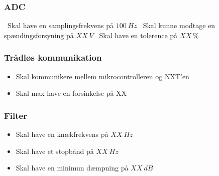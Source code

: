 \subsubsection{ADC}
\begin{itemize}
\ Skal have en samplingsfrekvens på $100~Hz$
\ Skal kunne modtage en spændingsforsyning på  $XX~V$
\ Skal have en tolerence på $XX~\%$
\end{itemize}

\subsubsection{Trådløs kommunikation}
\begin{itemize}
\item Skal kommunikere mellem mikrocontrolleren og NXT'en 
\item Skal max have en forsinkelse på XX
\end{itemize}

\subsubsection{Filter}
\begin{itemize}
\item Skal have en knækfrekvens på $XX~Hz$
\item Skal have et stopbånd på $XX~Hz$
\item Skal have en minimun dæmpning på $XX~dB$
\end{itemize}